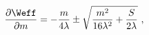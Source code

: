\begin{equation}
\label{eq:qcdkonishi2}
\frac{\partial \Weff}{\partial m}=-\frac{m}{4\lambda}  \pm 
\sqrt{\frac{m^2}{16 \lambda^2}+\frac{S}{2\lambda}} ~,
\end{equation}

